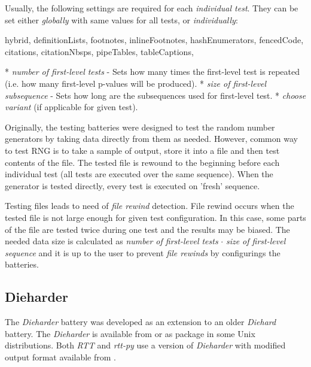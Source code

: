 \documentclass[
  digital,     %
  oneside,     %
  nosansbold,  %
  nocolorbold, %
  nolof,         %
  nolot,         %
]{fithesis4}
\begin{document}
Usually, the following settings are required for each \emph{individual test}. They can be set either \emph{globally} with same values for all tests, or \emph{individually}:
\begin{markdown*}{%
  hybrid,
  definitionLists,
  footnotes,
  inlineFootnotes,
  hashEnumerators,
  fencedCode,
  citations,
  citationNbsps,
  pipeTables,
  tableCaptions,
}

* \emph{number of first-level tests} - Sets how many times the first-level test is repeated (i.e. how many first-level p-values will be produced).
* \emph{size of first-level subsequence} - Sets how long are the subsequences used for first-level test.
* \emph{choose variant} (if applicable for given test).


\end{markdown*}



Originally, the testing batteries were designed to test the random number generators by taking data directly from them as needed. However, common way to test RNG is to take a sample of output, store it into a file and then test contents of the file. The tested file is rewound to the beginning before each individual test (all tests are executed over the same sequence). When the generator is tested directly, every test is executed on 'fresh' sequence. 

Testing files leads to need of \emph{file rewind} detection. File rewind occurs when the tested file is not large enough for given test configuration. In this case, some parts of the file are tested twice during one test and the results may be biased. The needed data size is calculated as \emph{number of first-level tests} $\cdot$ \emph{size of first-level sequence} and it is up to the user to prevent \emph{file rewinds} by configurings the batteries.


\subsection{Dieharder} \label{chap:sols-dieharder}
The \emph{Dieharder} battery was developed as an extension to an older \emph{Diehard} battery. The \emph{Dieharder} is available from \cite{dieharder_orig} or as package in some Unix distributions. Both \emph{RTT} and \emph{rtt-py} use a version of \emph{Dieharder} with modified output format available from \cite{rtt-batteries}.
\end{document}
